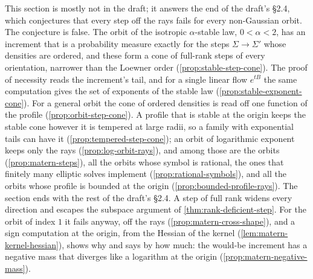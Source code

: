 This section is mostly not in the draft; it answers the end of the draft's \S 2.4, which conjectures
that every step off the rays fails for every non-Gaussian orbit. The conjecture is false. The orbit
of the isotropic $\alpha$-stable law, $0 < \alpha < 2$, has an increment that is a probability
measure exactly for the steps $\Sigma \to \Sigma'$ whose \Levy{} densities are ordered, and these
form a cone of full-rank steps of every orientation, narrower than the Loewner order
(\ref{prop:stable-step-cone}). The proof of necessity reads the increment's tail, and for a single
linear flow $e^{tB}$ the same computation gives the set of exponents of the stable law
(\ref{prop:stable-exponent-cone}). For a general orbit the cone of ordered \Levy{} densities is read
off one function of the profile (\ref{prop:orbit-step-cone}). A profile that is stable at the origin
keeps the stable cone however it is tempered at large radii, so a family with exponential tails can
have it (\ref{prop:tempered-step-cone}); an orbit of logarithmic exponent keeps only the rays
(\ref{prop:log-orbit-rays}), and among those are the \Matern{} orbits (\ref{prop:matern-steps}), all
the orbits whose symbol is rational, the ones that finitely many elliptic solves implement
(\ref{prop:rational-symbols}), and all the orbits whose profile is bounded at the origin
(\ref{prop:bounded-profile-rays}). The section ends with the rest of the draft's \S 2.4. A step of
full rank widens every direction and escapes the subspace argument of \ref{thm:rank-deficient-step}.
For the \Matern{} orbit of index $1$ it fails anyway, off the rays (\ref{prop:matern-cross-shape}),
and a sign computation at the origin, from the Hessian of the \Matern{} kernel
(\ref{lem:matern-kernel-hessian}), shows why and says by how much: the would-be
increment has a negative mass that diverges like a logarithm at the origin
(\ref{prop:matern-negative-mass}).

